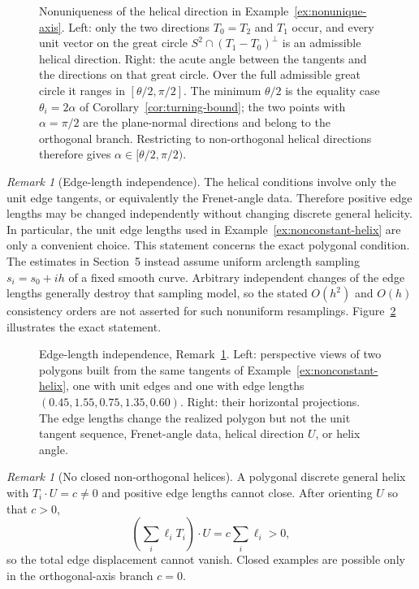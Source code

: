 \documentclass[10pt,a4paper]{amsart}
\theoremstyle{definition}
\theoremstyle{remark}
\newtheorem{remark}[theorem]{Remark}
\numberwithin{equation}{section}
\begin{document}
\begin{figure}[!ht]
\centering
\resizebox{0.97\textwidth}{!}{}
\caption{Nonuniqueness of the helical direction in Example~\ref{ex:nonunique-axis}. Left: only the two directions $T_0=T_2$ and $T_1$ occur, and every unit vector on the great circle $S^2\cap(T_1-T_0)^{\perp}$ is an admissible helical direction. Right: the acute angle between the tangents and the directions on that great circle. Over the full admissible great circle it ranges in $[\theta/2,\pi/2]$. The minimum $\theta/2$ is the equality case $\theta_i=2\alpha$ of Corollary~\ref{cor:turning-bound}; the two points with $\alpha=\pi/2$ are the plane-normal directions and belong to the orthogonal branch. Restricting to non-orthogonal helical directions therefore gives $\alpha\in[\theta/2,\pi/2)$.}
\label{fig:axis-nonuniqueness}
\end{figure}

\begin{remark}[Edge-length independence]\label{rem:length-independence}
The helical conditions involve only the unit edge tangents, or equivalently the Frenet-angle data. Therefore positive edge lengths may be changed independently without changing discrete general helicity. In particular, the unit edge lengths used in Example~\ref{ex:nonconstant-helix} are only a convenient choice. This statement concerns the exact polygonal condition. The estimates in Section~5 instead assume uniform arclength sampling $s_i=s_0+ih$ of a fixed smooth curve. Arbitrary independent changes of the edge lengths generally destroy that sampling model, so the stated $O(h^2)$ and $O(h)$ consistency orders are not asserted for such nonuniform resamplings.  Figure~\ref{fig:edge-length} illustrates the exact statement.
\end{remark}

\begin{figure}[!ht]
\centering
\resizebox{0.97\textwidth}{!}{}
\caption{Edge-length independence, Remark~\ref{rem:length-independence}. Left: perspective views of two polygons built from the same tangents of Example~\ref{ex:nonconstant-helix}, one with unit edges and one with edge lengths $(0.45,1.55,0.75,1.35,0.60)$. Right: their horizontal projections. The edge lengths change the realized polygon but not the unit tangent sequence, Frenet-angle data, helical direction $U$, or helix angle.}
\label{fig:edge-length}
\end{figure}

\begin{remark}[No closed non-orthogonal helices]\label{rem:no-closed}
A polygonal discrete general helix with $T_i\cdot U=c\ne0$ and positive edge lengths cannot close. After orienting $U$ so that $c>0$,
\[
\left(\sum_i \ell_iT_i\right)\cdot U=c\sum_i\ell_i>0,
\]
so the total edge displacement cannot vanish. Closed examples are possible only in the orthogonal-axis branch $c=0$.
\end{remark}
\end{document}
